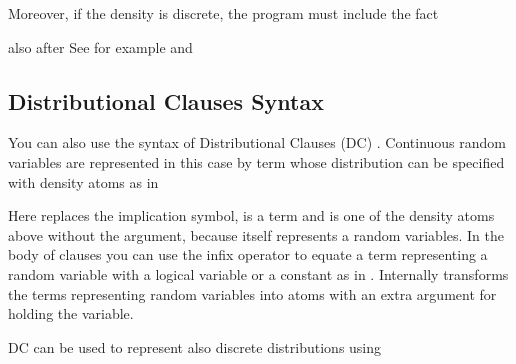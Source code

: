 \documentclass[letterpaper,10pt,english]{sphinxmanual}
\begin{document}
Moreover, if the density is discrete, the program must include the fact

\begin{sphinxVerbatim}[commandchars=\\\{\}]
\end{sphinxVerbatim}

also after 
See for example  and 


\subsection{Distributional Clauses Syntax}
\label{\detokenize{index:distributional-clauses-syntax}}
You can also use the syntax of Distributional Clauses (DC) .
Continuous random variables are represented in this case by term whose distribution can be specified with density atoms as in

\begin{sphinxVerbatim}[commandchars=\\\{\}]
\end{sphinxVerbatim}

Here \sphinxcode{\sphinxupquote{:=}} replaces the implication symbol,  is a term and  is one of the density atoms above without the  argument, because  itself represents a random variables.
In the body of clauses you can use the infix operator \sphinxcode{\sphinxupquote{\textasciitilde{}=}} to equate a term representing a random variable with a logical variable or a constant as in .
Internally  transforms the terms representing random variables into atoms with an extra argument for holding the variable.

DC can be used to represent also discrete distributions using

\begin{sphinxVerbatim}[commandchars=\\\{\}]
  
  
\end{sphinxVerbatim}
\end{document}
